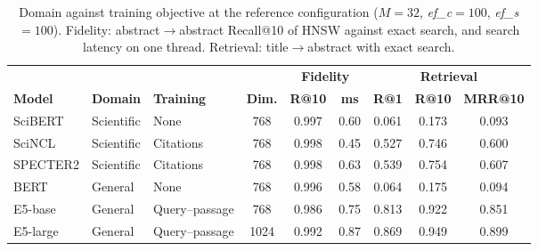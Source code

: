 \begin{table}[tbp]
\caption{Domain against training objective at the reference configuration ($M=32$, \textit{ef\_c}$=100$, \textit{ef\_s}$=100$). Fidelity: abstract$\rightarrow$abstract Recall@10 of HNSW against exact search, and search latency on one thread. Retrieval: title$\rightarrow$abstract with exact search.}\label{tab:modelos}
\centering
\small
\begin{tabular}{|l|l|l|c|c|c|c|c|c|}
\hline
\multicolumn{4}{|c|}{} & \multicolumn{2}{c|}{\textbf{Fidelity}} & \multicolumn{3}{c|}{\textbf{Retrieval}} \\ \cline{5-9}
\textbf{Model} & \textbf{Domain} & \textbf{Training} & \textbf{Dim.} & \textbf{R@10} & \textbf{ms} & \textbf{R@1} & \textbf{R@10} & \textbf{MRR@10} \\
\hline
SciBERT & Scientific & None & 768 & 0.997 & 0.60 & 0.061 & 0.173 & 0.093 \\
SciNCL & Scientific & Citations & 768 & 0.998 & 0.45 & 0.527 & 0.746 & 0.600 \\
SPECTER2 & Scientific & Citations & 768 & 0.998 & 0.63 & 0.539 & 0.754 & 0.607 \\
BERT & General & None & 768 & 0.996 & 0.58 & 0.064 & 0.175 & 0.094 \\
E5-base & General & Query--passage & 768 & 0.986 & 0.75 & 0.813 & 0.922 & 0.851 \\
E5-large & General & Query--passage & 1024 & 0.992 & 0.87 & 0.869 & 0.949 & 0.899 \\
\hline
\end{tabular}
\end{table}